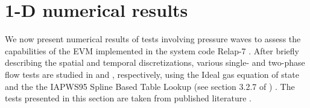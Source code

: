 \documentclass{inputs/mc2015}
\begin{document}
\section{1-D numerical results}\label{sec:results}
%
%
We now present numerical results of tests involving pressure waves to assess the capabilities of the EVM implemented in the system code Relap-7 \cite{Berry_Peterson_2014}.  After briefly describing the spatial and temporal discretizations, various single- and two-phase flow tests are studied in  and , respectively, using the Ideal gas equation of state and the the IAPWS95 Spline Based Table Lookup (see section 3.2.7 of \cite{relap7-manual}) . The tests presented in this section are taken from published literature \cite{Sokolowski-Koszela, Serre-bestion}.
%
%
\end{document}
